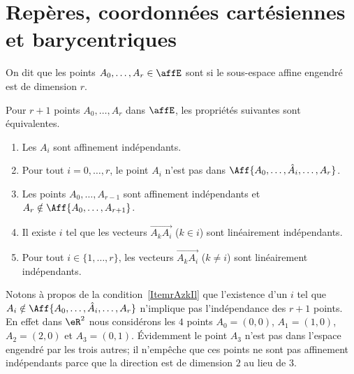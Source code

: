 \section{Repères, coordonnées cartésiennes et barycentriques}

\begin{definition}
    On dit que les points \( A_0,\ldots, A_r\in \affE\) sont  si le sous-espace affine engendré est de dimension \( r\).
\end{definition}

\begin{proposition}  \label{PropGAneHg}
    Pour \( r+1\) points \( A_0,\ldots, A_r\) dans \( \affE\), les propriétés suivantes sont équivalentes.
    \begin{enumerate}
        \item
            Les \( A_i\) sont affinement indépendants.
        \item
            Pour tout \( i=0,\ldots, r\), le point \( A_i\) n'est pas dans \( \Aff\{ A_0,\ldots, \hat A_i,\ldots, A_r \}\).
        \item\label{ItemrAzkIl}
            Les points \( A_0,\ldots, A_{r-1}\) sont affinement indépendants et \( A_r\notin\Aff\{ A_0,\ldots, A_{r+1} \}\).
        \item
            Il existe \( i\) tel que les vecteurs \( \overrightarrow{ A_kA_i }\) (\( k\in i\)) sont linéairement indépendants.
        \item\label{ItemFBfcuq}
            Pour tout \( i\in\{ 1,\ldots, r \}\), les vecteurs \( \overrightarrow{ A_kA_i }\) (\( k\neq i\)) sont linéairement indépendants.
    \end{enumerate}
\end{proposition}

Notons à propos de la condition~\ref{ItemrAzkIl} que l'existence d'un \( i\) tel que \( A_i\notin\Aff\{ A_0,\ldots, \hat A_i,\ldots, A_r \}\) n'implique pas l'indépendance des \( r+1\) points. En effet dans \( \eR^2\) nous considérons les \( 4\) points \( A_0=(0,0)\), \( A_1=(1,0)\), \( A_2=(2,0)\) et \( A_3=(0,1)\). Évidemment le point \( A_3\) n'est pas dans l'espace engendré par les trois autres; il n'empêche que ces points ne sont pas affinement indépendants parce que la direction est de dimension \( 2\) au lieu de \( 3\).

